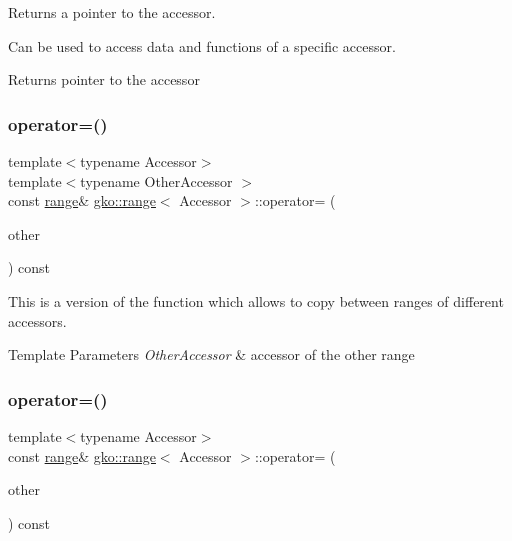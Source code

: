 Returns a pointer to the accessor. 

Can be used to access data and functions of a specific accessor.

\begin{DoxyReturn}{Returns}
pointer to the accessor 
\end{DoxyReturn}
\mbox{\label{classgko_1_1range_ab58e7e142727278bfd837dbc6f7d5b51}} 
\subsubsection{\texorpdfstring{operator=()}{operator=()}\hspace{0.1cm}{\footnotesize\ttfamily [1/2]}}
{\footnotesize\ttfamily template$<$typename Accessor$>$ \\
template$<$typename Other\+Accessor $>$ \\
const \hyperlink{classgko_1_1range}{range}\& \hyperlink{classgko_1_1range}{gko\+::range}$<$ Accessor $>$\+::operator= (\begin{DoxyParamCaption}\item[{const \hyperlink{classgko_1_1range}{range}$<$ Other\+Accessor $>$ \&}]{other }\end{DoxyParamCaption}) const\hspace{0.3cm}{\ttfamily [inline]}}





This is a version of the function which allows to copy between ranges of different accessors.


\begin{DoxyTemplParams}{Template Parameters}
{\em Other\+Accessor} & accessor of the other range \\
\hline
\end{DoxyTemplParams}
\mbox{\label{classgko_1_1range_af3761a7996e353988dea26581f4390aa}} 
\subsubsection{\texorpdfstring{operator=()}{operator=()}\hspace{0.1cm}{\footnotesize\ttfamily [2/2]}}
{\footnotesize\ttfamily template$<$typename Accessor$>$ \\
const \hyperlink{classgko_1_1range}{range}\& \hyperlink{classgko_1_1range}{gko\+::range}$<$ Accessor $>$\+::operator= (\begin{DoxyParamCaption}\item[{const \hyperlink{classgko_1_1range}{range}$<$ Accessor $>$ \&}]{other }\end{DoxyParamCaption}) const\hspace{0.3cm}{\ttfamily [inline]}}



